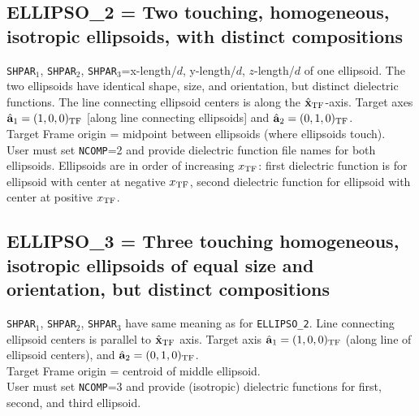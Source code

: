 \subsection{ ELLIPSO\_2 = Two touching, homogeneous, isotropic ellipsoids,
	    with distinct compositions
            \label{sec:ELLIPSO_2}}
	{\tt SHPAR$_1$}, {\tt SHPAR$_2$},
        {\tt SHPAR}$_3$=x-length/$d$, y-length/$d$,
	$z$-length/$d$ of one ellipsoid.
	The two ellipsoids have identical shape, size, and orientation,
	but distinct dielectric functions.
	The line connecting ellipsoid centers is along the $\hat{\bf x}_{\rm TF}$-axis.
	Target axes ${\hat{\bf a}}_1=(1,0,0)_{\rm TF}$ 
	[along line connecting ellipsoids]
	and ${\hat{\bf a}}_2=(0,1,0)_{\rm TF}$.\\
	Target Frame origin = midpoint between ellipsoids
        (where ellipsoids touch).\\
	User must set {\tt NCOMP}=2 and provide dielectric function file names
	for both ellipsoids. 
	Ellipsoids are in order of increasing $x_{\rm TF}$:
	first dielectric function is for ellipsoid with 
	center at negative $x_{\rm TF}$, second dielectric function for 
	ellipsoid with center at positive $x_{\rm TF}$.
\subsection{ ELLIPSO\_3 = Three touching homogeneous, isotropic ellipsoids 
	    of equal size and orientation, but distinct compositions
            \label{sec:ELLIPSO_3}}
	{\tt SHPAR$_1$}, {\tt SHPAR$_2$}, {\tt SHPAR}$_3$ have same meaning
        as for {\tt ELLIPSO\_2}.
	Line connecting ellipsoid centers is parallel to $\hat{\bf x}_{\rm TF}$ axis.  
	Target axis ${\hat{\bf a}}_1=(1,0,0)_{\rm TF}$ 
	(along line of ellipsoid centers), and
	${\hat{\bf a}}_2=(0,1,0)_{\rm TF}$.\\
	Target Frame origin = centroid of middle ellipsoid.\\
	User must set {\tt NCOMP}=3 and provide (isotropic) dielectric 
	functions for first, second, and third ellipsoid.

